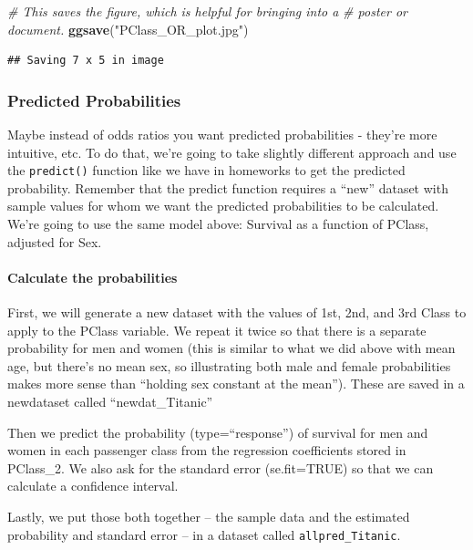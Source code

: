 \documentclass[]{article}
\newenvironment{Shaded}{\begin{snugshade}}{\end{snugshade}}
\newcommand{\CommentTok}[1]{\textcolor[rgb]{0.56,0.35,0.01}{\textit{#1}}}
\newcommand{\KeywordTok}[1]{\textcolor[rgb]{0.13,0.29,0.53}{\textbf{#1}}}
\newcommand{\NormalTok}[1]{#1}
\newcommand{\StringTok}[1]{\textcolor[rgb]{0.31,0.60,0.02}{#1}}
\let\oldparagraph\paragraph
\renewcommand{\paragraph}[1]{\oldparagraph{#1}\mbox{}}
\begin{document}
\begin{Shaded}
\begin{Highlighting}[]
\CommentTok{# This saves the figure, which is helpful for bringing into a}
\CommentTok{# poster or document.}
\KeywordTok{ggsave}\NormalTok{(}\StringTok{"PClass_OR_plot.jpg"}\NormalTok{)}
\end{Highlighting}
\end{Shaded}

\begin{verbatim}
## Saving 7 x 5 in image
\end{verbatim}

\hypertarget{predicted-probabilities}{%
\subsubsection{Predicted Probabilities}\label{predicted-probabilities}}

Maybe instead of odds ratios you want predicted probabilities - they're
more intuitive, etc. To do that, we're going to take slightly different
approach and use the \texttt{predict()} function like we have in
homeworks to get the predicted probability. Remember that the predict
function requires a ``new'' dataset with sample values for whom we want
the predicted probabilities to be calculated. We're going to use the
same model above: Survival as a function of PClass, adjusted for Sex.

\hypertarget{calculate-the-probabilities}{%
\paragraph{Calculate the
probabilities}\label{calculate-the-probabilities}}

First, we will generate a new dataset with the values of 1st, 2nd, and
3rd Class to apply to the PClass variable. We repeat it twice so that
there is a separate probability for men and women (this is similar to
what we did above with mean age, but there's no mean sex, so
illustrating both male and female probabilities makes more sense than
``holding sex constant at the mean''). These are saved in a newdataset
called ``newdat\_Titanic''

Then we predict the probability (type=``response'') of survival for men
and women in each passenger class from the regression coefficients
stored in PClass\_2. We also ask for the standard error (se.fit=TRUE) so
that we can calculate a confidence interval.

Lastly, we put those both together -- the sample data and the estimated
probability and standard error -- in a dataset called
\texttt{allpred\_Titanic}.
\end{document}
